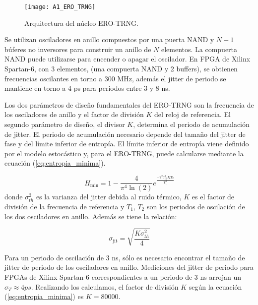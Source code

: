 				\begin{figure}[hbtp]
					\centering
					\texttt{[image: A1\_ERO\_TRNG]}
					\caption{Arquitectura del núcleo ERO-TRNG.}
					\label{fig:A1_ERO_TRNG}
				\end{figure}
                
            Se utilizan osciladores en anillo compuestos por una puerta NAND y $N - 1$ búferes no inversores para construir un anillo de $N$ elementos. La compuerta NAND puede utilizarse para encender o apagar el oscilador. En FPGA de Xilinx Spartan-6, con 3 elementos, (una compuerta NAND y 2 buffers), se obtienen frecuencias oscilantes en torno a 300 MHz, además el jitter de periodo se mantiene en torno a 4 ps para periodos entre 3 y 8 ns. 

            Los dos parámetros de diseño fundamentales del ERO-TRNG son la frecuencia de los osciladores de anillo y el factor de división $K$ del reloj de referencia. El segundo parámetro de diseño, el divisor $K$, determina el periodo de acumulación de jitter. El periodo de acumulación necesario depende del tamaño del jitter  de fase y del límite inferior de entropía. El límite inferior de entropía viene definido por el modelo estocástico y, para el ERO-TRNG, puede calcularse mediante la ecuación (\ref{eq:entropia_minima}).

            \begin{equation}
                H_{\text{min}}  = 1 - \frac{4}{\pi ^{4} \ln (2) } e^{ \frac{-\pi^{2} \sigma_{th}^{2} K T_{2}}{T_{1}^{3}} } 
                \label{eq:entropia_minima}
            \end{equation}
            donde $\sigma_{th}^{2}$ es la varianza del jitter debida al ruido térmico, $K$ es el factor de división de la frecuencia de referencia y $T_{1}$, $T_{2}$ son los periodos de oscilación de los dos osciladores en anillo. Además se tiene la relación:

            \begin{equation}
                \sigma_{\text{jit}} = \sqrt{ \frac{K \sigma_{th}^{2} }{4} }
                \label{eq:relacion}
            \end{equation}

            Para un periodo de oscilación de 3 ns, sólo es necesario encontrar el tamaño de jitter de periodo de los osciladores en anillo. Mediciones del jitter de periodo para FPGAs de Xilinx Spartan-6 correspondientes a un periodo de 3 ns arrojan un $\sigma_{T} \approx 4ps$. Realizando los calculamos, el factor de división $K$ según la ecuación (\ref{eq:entropia_minima}) es $K = 80 000$.

